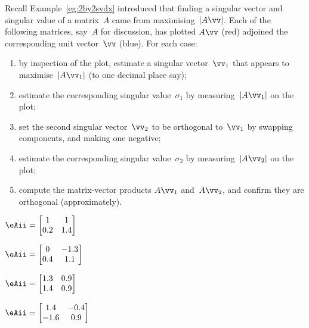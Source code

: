 \begin{exercise} \label{ex:} 
Recall  Example~\ref{eg:2by2svdx} introduced that finding a singular vector and singular value of a matrix~\(A\) came from maximising~\(|A\vv|\).
Each of the following matrices, say~\(A\) for discussion, has plotted \(A\vv\) (red) adjoined the corresponding unit vector~\(\vv\) (blue).
For each case:
\begin{enumerate}
\def\theenumii{\roman{enumii}}
\item by inspection of the plot, estimate a singular vector~\(\vv_1\) that appears to maximise~\(|A\vv_1|\) (to one decimal place say);
\item estimate the corresponding singular value~\(\sigma_1\) by measuring~\(|A\vv_1|\) on the plot;
\item set the second singular vector~\(\vv_2\) to be orthogonal to~\(\vv_1\) by swapping components, and making one negative;
\item estimate the corresponding singular value~\(\sigma_2\) by measuring~\(|A\vv_2|\) on the plot;
\item compute the matrix-vector products \(A\vv_1\) and~\(A\vv_2\), and confirm they are orthogonal (approximately).
\end{enumerate}

\def\eRosesize{small}
\begin{parts}
\item \(\eAii=\begin{bmatrix} 1&1\\0.2&1.4 \end{bmatrix}\) 

\item \(\eAii=\begin{bmatrix} 0&-1.3\\0.4&1.1 \end{bmatrix}\) 

\item \(\eAii=\begin{bmatrix} 1.3&0.9\\1.4&0.9 \end{bmatrix}\) 

\item \(\eAii=\begin{bmatrix} 1.4&-0.4\\-1.6&0.9 \end{bmatrix}\) 

\end{parts}
\end{exercise}






